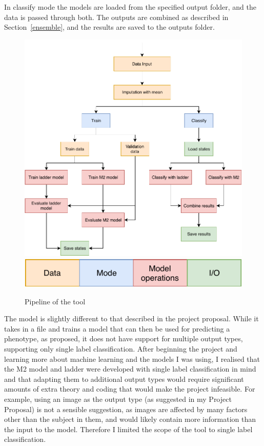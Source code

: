 In classify mode the models are loaded from the specified output folder, and the data is passed through both. The outputs are combined 
as described in Section~\ref{ensemble}, and the results are saved to the outputs folder.
\begin{figure}[H]
\centering\includegraphics[scale=.9]{figs/tool.pdf}
\centering\includegraphics[scale=.75, right]{figs/pipeline_key.pdf}
\caption{Pipeline of the tool}
\label{fig:pipeline}
\end{figure}

The model is slightly different to that described in the project proposal. While it takes in a file and trains a model that can then be 
used for predicting a phenotype, as proposed, it does not have support for multiple output types, supporting only single label classification. 
After beginning the project and learning more about machine learning and the models I was using, I realised that the M2 model and ladder 
were developed with single label classification in mind and that adapting them to additional output types would require significant 
amounts of extra theory and coding that would make the project infeasible. For example, using an image as the output type (as suggested in
my Project Proposal) is not a sensible suggestion, as images are affected by many factors other than the subject in them, and would likely 
contain more information than the input to the model. Therefore I limited the scope of the tool to single label classification.